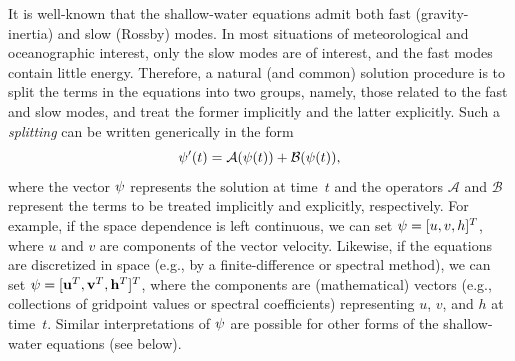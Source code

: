 \documentclass[12pt]{article}
\renewcommand{\u}{\mathbf{u}}
\renewcommand{\v}{\mathbf{v}}
\newcommand{\opA}{\mathcal{A}}
\newcommand{\opB}{\mathcal{B}}
\newcommand{\h}{\mathbf{h}}
\begin{document}
It is well-known that the shallow-water equations admit both fast
(gravity-inertia) and slow (Rossby) modes.  In most situations of
meteorological and oceanographic interest, only the slow modes are of
interest, and the fast modes contain little energy.  Therefore, a natural 
(and common) solution procedure is to split the terms in the equations into
two groups, namely, those related to the fast and slow modes, and treat the
former implicitly and the latter explicitly.  Such a \emph{splitting} can be
written generically in the form
\begin{equation}
  \solvec'(t) = \opA(\solvec(t)) + \opB(\solvec(t)) ,
\label{ODE}
\end{equation}
where the vector $\psi$ represents the solution at time~$t$ and the
operators $\opA$ and $\opB$ represent the terms to be treated implicitly and
explicitly, respectively.  For example, if the space dependence is left
continuous, we can set $\psi = [u,v,h]^T$, where $u$ and $v$ are components
of the vector velocity.  Likewise, if the equations are discretized in space
(e.g., by a finite-difference or spectral method), we can set $\solvec =
[\u^T,\v^T,\h^T]^T$, where the components are (mathematical) vectors (e.g.,
collections of gridpoint values or spectral coefficients) representing $u$,
$v$, and $h$ at time~$t$.  Similar interpretations of $\psi$ are possible
for other forms of the shallow-water equations (see below).
\end{document}
